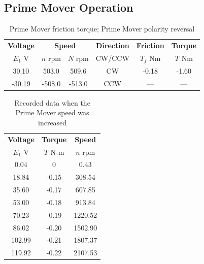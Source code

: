 \documentclass{article}
\begin{document}
\subsection{Prime Mover Operation}

\begin{table}[H]
  \centering
  \begin{tabular}{*{6}{c}}
    \textbf{Voltage} & \multicolumn{2}{c}{\textbf{Speed}} & \textbf{Direction}
    & \textbf{Friction} & \textbf{Torque} \\
    $E_1$ V & $n$ rpm & $N$ rpm & CW/CCW & $T_f$ Nm & $T$ Nm \\
    \hline
     30.10 &  503.0 &  509.6 &  CW & -0.18 & -1.60 \\
    -30.19 & -508.0 & -513.0 & CCW &   --- &   --- \\
  \end{tabular}
  \caption{Prime Mover friction torque; Prime Mover polarity reversal}
  \label{tab:table_01}
\end{table}

\begin{table}[H]
  \centering
  \begin{tabular}{*{3}{c}}
    \textbf{Voltage} & \textbf{Torque} & \textbf{Speed} \\
    $E_1$ V          & $T$ N-m         & $n$ rpm \\

    \hline

      0.04 &     0 &    0.43 \\
     18.84 & -0.15 &  308.54 \\
     35.60 & -0.17 &  607.85 \\
     53.00 & -0.18 &  913.84 \\
     70.23 & -0.19 & 1220.52 \\
     86.02 & -0.20 & 1502.90 \\
    102.99 & -0.21 & 1807.37 \\
    119.92 & -0.22 & 2107.53 \\
  \end{tabular}
  \caption{Recorded data when the Prime Mover speed was increased}
  \label{tab:table_02}
\end{table}
\end{document}
